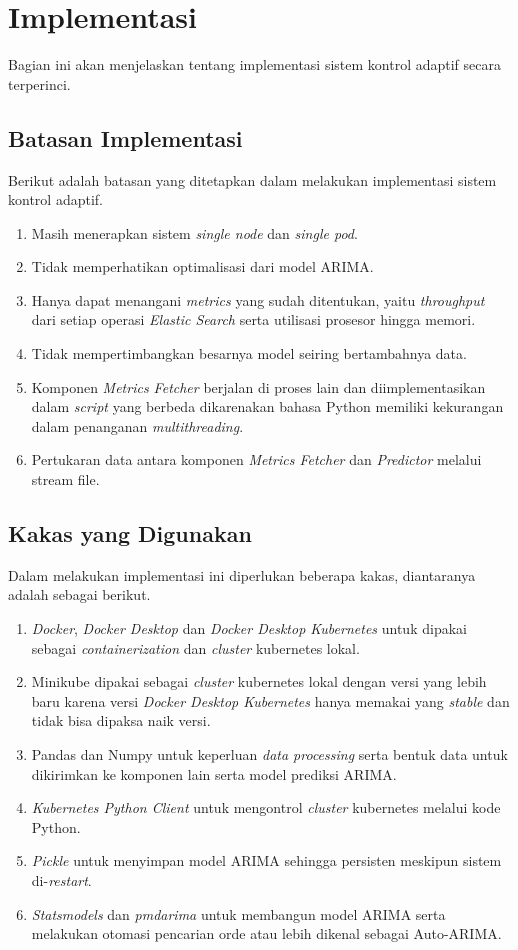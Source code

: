 \section{Implementasi}

Bagian ini akan menjelaskan tentang implementasi sistem kontrol adaptif secara terperinci.

\subsection{Batasan Implementasi}
Berikut adalah batasan yang ditetapkan dalam melakukan implementasi sistem kontrol adaptif.
\begin{enumerate}
    \item Masih menerapkan sistem \textit{single node} dan \textit{single pod}.
    \item Tidak memperhatikan optimalisasi dari model ARIMA.
    \item Hanya dapat menangani \textit{metrics} yang sudah ditentukan, yaitu \textit{throughput} dari setiap operasi \textit{Elastic Search} serta utilisasi prosesor hingga memori.
    \item Tidak mempertimbangkan besarnya model seiring bertambahnya data.
    \item Komponen \textit{Metrics Fetcher} berjalan di proses lain dan diimplementasikan dalam \textit{script} yang berbeda dikarenakan bahasa Python memiliki kekurangan dalam penanganan \textit{multithreading}.
    \item Pertukaran data antara komponen \textit{Metrics Fetcher} dan \textit{Predictor} melalui stream file.
\end{enumerate}

\subsection{Kakas yang Digunakan}
Dalam melakukan implementasi ini diperlukan beberapa kakas, diantaranya adalah sebagai berikut.
\begin{enumerate}
    \item \textit{Docker}, \textit{Docker Desktop} dan \textit{Docker Desktop Kubernetes} untuk dipakai sebagai \textit{containerization} dan \textit{cluster} kubernetes lokal.
    \item Minikube dipakai sebagai \textit{cluster} kubernetes lokal dengan versi yang lebih baru karena versi \textit{Docker Desktop Kubernetes} hanya memakai yang \textit{stable} dan tidak bisa dipaksa naik versi.
    \item Pandas dan Numpy untuk keperluan \textit{data processing} serta bentuk data untuk dikirimkan ke komponen lain serta model prediksi ARIMA.
    \item \textit{Kubernetes Python Client} untuk mengontrol \textit{cluster} kubernetes melalui kode Python.
    \item \textit{Pickle} untuk menyimpan model ARIMA sehingga persisten meskipun sistem di-\textit{restart}.
    \item \textit{Statsmodels} dan \textit{pmdarima} untuk membangun model ARIMA serta melakukan otomasi pencarian orde atau lebih dikenal sebagai Auto-ARIMA.
\end{enumerate}